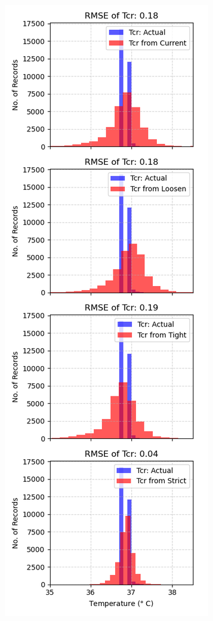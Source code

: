 \documentclass[1p]{elsarticle}
\begin{document}
\begin{figure}[H]
    \includegraphics[width=0.49\linewidth]{figures/Tcr_dist.png}
    \label{fig:dist-cr-sk}
\end{figure}
\end{document}
